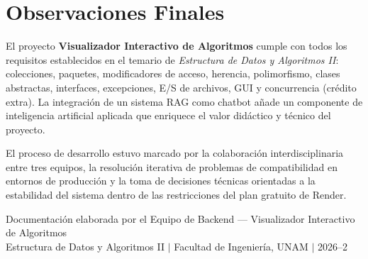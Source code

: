 \documentclass[12pt, letterpaper]{article}
\begin{document}
	\section{Observaciones Finales}
	El proyecto \textbf{Visualizador Interactivo de Algoritmos} cumple con todos los requisitos establecidos en el temario de \textit{Estructura de Datos y Algoritmos II}: colecciones, paquetes, modificadores de acceso, herencia, polimorfismo, clases abstractas, interfaces, excepciones, E/S de archivos, GUI y concurrencia (crédito extra). La integración de un sistema RAG como chatbot añade un componente de inteligencia artificial aplicada que enriquece el valor didáctico y técnico del proyecto.
	
	El proceso de desarrollo estuvo marcado por la colaboración interdisciplinaria entre tres equipos, la resolución iterativa de problemas de compatibilidad en entornos de producción y la toma de decisiones técnicas orientadas a la estabilidad del sistema dentro de las restricciones del plan gratuito de Render.
	
	\vspace{1cm}
	\begin{center}
		\color{gray}\small
		Documentación elaborada por el Equipo de Backend — Visualizador Interactivo de Algoritmos\\
		Estructura de Datos y Algoritmos II $\mid$ Facultad de Ingeniería, UNAM $\mid$ 2026--2
	\end{center}
	
\end{document}
